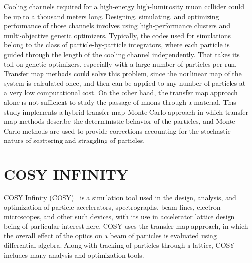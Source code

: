 \documentclass{jacow}
\begin{document}

Cooling channels required for a high-energy high-luminosity muon collider could be up to a thousand meters long. Designing, simulating, and optimizing performance of those channels involves using high-performance clusters and multi-objective genetic optimizers. Typically, the codes used for simulations belong to the class of particle-by-particle integrators, where each particle is guided through the length of the cooling channel independently. That takes its toll on genetic optimizers, especially with a large number of particles per run. Transfer map methods could solve this problem, since the nonlinear map of the system is calculated once, and then can be applied to any number of particles at a very low computational cost. On the other hand, the transfer map approach alone is not sufficient to study the passage of muons through a material. This study implements a hybrid transfer map--Monte Carlo approach in which transfer map methods describe the deterministic behavior of the particles, and Monte Carlo methods are used to provide corrections accounting for the stochastic nature of scattering and straggling of particles. %

\section{COSY INFINITY}

COSY Infinity (COSY)~\cite{COSY} is a simulation tool used in the design, analysis, and optimization of particle accelerators, spectrographs, beam lines, electron microscopes, and other such devices, with its use in accelerator lattice design being of particular interest here. COSY uses the transfer map approach, in which the overall effect of the optics on a beam of particles is evaluated using differential algebra. Along with tracking of particles through a lattice, COSY includes many analysis and optimization tools. %
\end{document}
